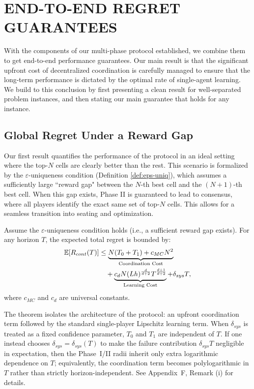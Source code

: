 \section{END-TO-END REGRET GUARANTEES}
\label{sec:global_guarantees}

With the components of our multi-phase protocol established, we combine them to get end-to-end performance guarantees. Our main result is that the significant upfront cost of decentralized coordination is carefully managed to ensure that the long-term performance is dictated by the optimal rate of single-agent learning. We build to this conclusion by first presenting a clean result for well-separated problem instances, and then stating our main guarantee that holds for any instance.

\subsection{Global Regret Under a Reward Gap}

Our first result quantifies the performance of the protocol in an ideal setting where the top-$N$ cells are clearly better than the rest. This scenario is formalized by the $\varepsilon$-uniqueness condition (Definition \ref{def:eps-uniq}), which assumes a sufficiently large ``reward gap" between the $N$-th best cell and the $(N+1)$-th best cell. When this gap exists, Phase II is guaranteed to lead to consensus, where all players identify the exact same set of top-$N$ cells. This allows for a seamless transition into seating and optimization.


\begin{theorem}
\label{thm:global}
Assume the $\varepsilon$-uniqueness condition holds (i.e., a sufficient reward gap exists). For any horizon $T$, the expected total regret is bounded by:
\begin{equation}
\label{eq:global-regret-bound}
\begin{aligned}
\mathbb{E}[R_{cont}(T)] &\le \underbrace{N(T_0 + T_1) + c_{MC}N^2}_{\text{Coordination Cost}} \\
&\quad + \underbrace{c_d N (Lh)^{\frac{d}{d+2}} T^{\frac{d+1}{d+2}}}_{\text{Learning Cost}} + \delta_{sys}T,
\end{aligned}
\end{equation}
where $c_{MC}$ and $c_d$ are universal constants.
\end{theorem}

The theorem isolates the architecture of the protocol: an upfront coordination term followed by the standard single-player Lipschitz learning term. When \(\delta_{sys}\) is treated as a fixed confidence parameter, \(T_0\) and \(T_1\) are independent of \(T\). If one instead chooses \(\delta_{sys}=\delta_{sys}(T)\) to make the failure contribution \(\delta_{sys}T\) negligible in expectation, then the Phase~I/II radii inherit only extra logarithmic dependence on \(T\); equivalently, the coordination term becomes polylogarithmic in \(T\) rather than strictly horizon-independent. See Appendix~F, Remark (i) for details.




